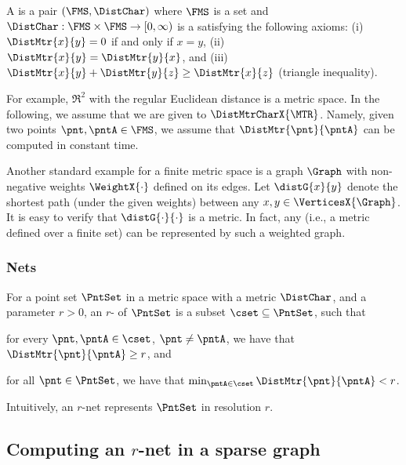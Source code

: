 \begin{defn}
    A  is a pair $(\FMS, \DistChar)$ where $\FMS$
    is a set and $\DistChar: \FMS \times \FMS \rightarrow [0, \infty)$
    is a  satisfying the following axioms: (i)
    $\DistMtr{x}{y} = 0$ if and only if $x =y$, (ii)
    $\DistMtr{x}{y}=\DistMtr{y}{x}$, and (iii)
    $\DistMtr{x}{y} + \DistMtr{y}{z} \geq \DistMtr{x}{ z}$ (triangle
    inequality).
\end{defn}

For example, $\Re^2$ with the regular Euclidean distance is a metric
space. In the following, we assume that we are given  to $\DistMtrCharX{\MTR}$. Namely, given two points
$\pnt, \pntA \in \FMS$, we assume that $\DistMtr{\pnt}{ \pntA}$ can be
computed in constant time.

Another standard example for a finite metric space is a graph $\Graph$
with non-negative weights $\WeightX{\cdot}$ defined on its edges.  Let
$\distG{x}{y}$ denote the shortest path (under the given weights)
between any $x,y \in \VerticesX{\Graph}$. It is easy to verify that
$\distG{\cdot}{\cdot}$ is a metric.  In fact, any  (i.e., a metric defined over a finite set) can be
represented by such a weighted graph.

\subsubsection{Nets}

\begin{definition}%
    For a point set $\PntSet$ in a metric space with a metric
    $\DistChar$, and a parameter $r>0$, an $r$- of
    $\PntSet$ is a subset $\cset \subseteq \PntSet$, such that
    \begin{compactenumi}
        \item for every $\pnt, \pntA \in \cset$, $\pnt \neq \pntA$, we
        have that $\DistMtr{\pnt}{\pntA} \geq r$, and
        \item for all $\pnt\in \PntSet$, we have that
        $\min_{\pntA\in \cset} \DistMtr{\pnt}{\pntA} < r$.
    \end{compactenumi}
\end{definition}

Intuitively, an $r$-net represents $\PntSet$ in resolution $r$.


\subsection{Computing an $r$-net in a sparse graph}

